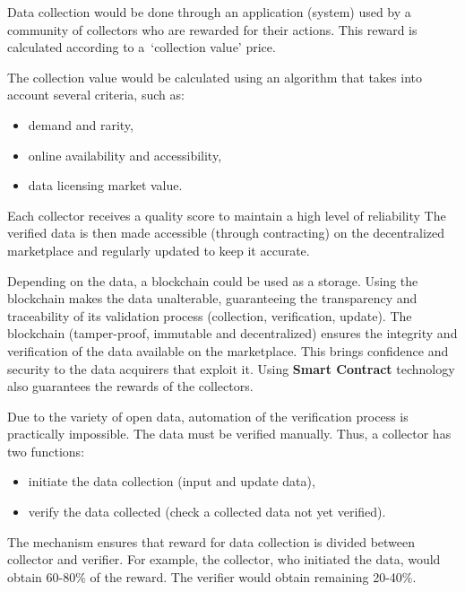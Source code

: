 Data collection would be done through an application (system) used by a community of collectors who are rewarded for their actions.
This reward is calculated according to a~\enquote*{collection value} price.

The collection value would be calculated using an algorithm that takes into account several criteria, such as:
\begin{itemize}
    \item demand and rarity,
    \item online availability and accessibility,
    \item data licensing market value.
\end{itemize}

Each collector receives a quality score to maintain a high level of reliability
The verified data is then made accessible (through contracting) on the decentralized marketplace and regularly updated to keep it accurate.

Depending on the data, a blockchain could be used as a storage.
Using the blockchain makes the data unalterable, guaranteeing the transparency and traceability of its validation process (collection, verification, update).
The blockchain (tamper-proof, immutable and decentralized) ensures the integrity and verification of the data available on the marketplace.
This brings confidence and security to the data acquirers that exploit it. 
Using \textbf{Smart Contract} technology also guarantees the rewards of the collectors.

Due to the variety of open data, automation of the verification process is practically impossible.
The data must be verified manually.
Thus, a collector has two functions:
\begin{itemize}
    \item initiate the data collection (input and update data),
    \item verify the data collected (check a collected data not yet verified).
\end{itemize}

The mechanism ensures that reward for data collection is divided between collector and verifier.
For example, the collector, who initiated the data, would obtain 60-80\% of the reward.
The verifier would obtain remaining 20-40\%.
